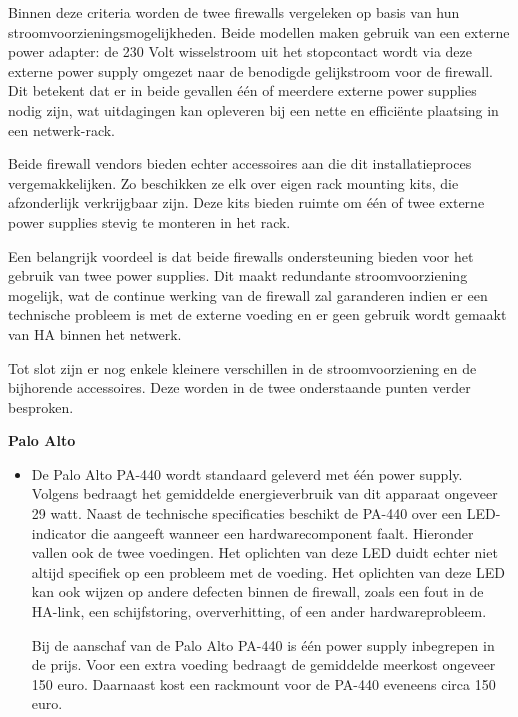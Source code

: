 Binnen deze criteria worden de twee firewalls vergeleken op basis van hun stroomvoorzieningsmogelijkheden. Beide modellen maken gebruik van een externe power adapter: de 230 Volt wisselstroom uit het stopcontact wordt via deze externe power supply omgezet naar de benodigde gelijkstroom voor de firewall. Dit betekent dat er in beide gevallen één of meerdere externe power supplies nodig zijn, wat uitdagingen kan opleveren bij een nette en efficiënte plaatsing in een netwerk-rack.

Beide firewall vendors bieden echter accessoires aan die dit installatieproces vergemakkelijken. Zo beschikken ze elk over eigen rack mounting kits, die afzonderlijk verkrijgbaar zijn. Deze kits bieden ruimte om één of twee externe power supplies stevig te monteren in het rack.

Een belangrijk voordeel is dat beide firewalls ondersteuning bieden voor het gebruik van twee power supplies. Dit maakt redundante stroomvoorziening mogelijk, wat de continue werking van de firewall zal garanderen indien er een technische probleem is met de externe voeding en er geen gebruik wordt gemaakt van HA binnen het netwerk.

Tot slot zijn er nog enkele kleinere verschillen in de stroomvoorziening en de bijhorende accessoires. Deze worden in de twee onderstaande punten verder besproken.

\textbf{Palo Alto}
\begin{itemize}[label=\textbullet]
    \item De Palo Alto PA-440 wordt standaard geleverd met één power supply. Volgens \textcite{PaloAltoHR2025} bedraagt het gemiddelde energieverbruik van dit apparaat ongeveer 29 watt. Naast de technische specificaties beschikt de PA-440 over een LED-indicator die aangeeft wanneer een hardwarecomponent faalt. Hieronder vallen ook de twee voedingen.
    Het oplichten van deze LED duidt echter niet altijd specifiek op een probleem met de voeding. Het oplichten van deze LED kan ook wijzen op andere defecten binnen de firewall, zoals een fout in de HA-link, een schijfstoring, oververhitting, of een ander hardwareprobleem.
    
    Bij de aanschaf van de Palo Alto PA-440 is één power supply inbegrepen in de prijs. Voor een extra voeding bedraagt de gemiddelde meerkost ongeveer 150 euro. Daarnaast kost een rackmount voor de PA-440 eveneens circa 150 euro.
\end{itemize}

